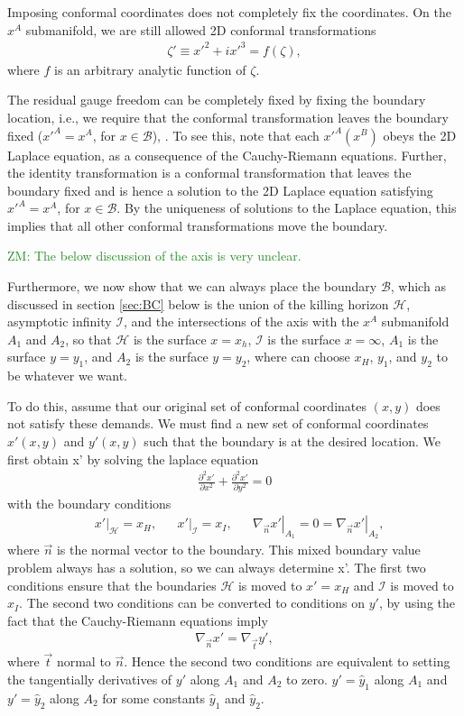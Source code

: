 \documentclass[aps,prd,amsmath,showpacs,amssymb,superscriptaddress,nofootinbib,longbibliography,eqsecnum,preprintnumbers]{revtex4-1}
\newcommand{\zach}[1]{\textcolor{ForestGreen}{#1}}
\begin{document}
Imposing conformal coordinates does not completely fix the coordinates. 
On the $x^A$ submanifold, we are still allowed 2D conformal transformations
\begin{align}
\zeta' \equiv  x'^2+ix'^3 = f(\zeta),
\end{align}
where $f$ is an arbitrary analytic function of $\zeta$.

The residual gauge freedom can be completely fixed by fixing the boundary location, i.e., we require that the conformal transformation leaves the boundary fixed ($x'^A=x^A$, for $x\in \mathcal B$), . To see this, note that each $x'^A(x^B)$ obeys the 2D Laplace equation, as a consequence of the Cauchy-Riemann equations. Further, the identity transformation is a conformal transformation that leaves the boundary fixed and is hence a solution to the 2D Laplace equation satisfying $x'^A=x^A$, for $x\in \mathcal B$. By the uniqueness of solutions to the Laplace equation, this implies that all other conformal transformations move the boundary.

\zach{ZM: The below discussion of the axis is very unclear.}

Furthermore, we now show that we can always place the boundary $\mathcal{B}$, which as discussed in section \ref{sec:BC} below is the union of the killing horizon $\mathcal H$, asymptotic infinity $\mathcal I$, and the intersections of the axis with the $x^A$ submanifold $A_1$ and $A_2$, so that $\mathcal H$ is the surface $x=x_h$, $\mathcal I$ is the surface $x=\infty$, $A_1$ is the surface $y=y_1$, and $A_2$ is the surface $y=y_2$, where can choose $x_H$, $y_1$, and $y_2$ to be whatever we want.

To do this, assume that our original set of conformal coordinates $(x,y)$ does not satisfy these demands. We must find a new set of conformal coordinates $x'(x,y)$ and $y'(x,y)$ such that the boundary is at the desired location. We first obtain x' by solving the laplace equation 
\begin{align}
\frac{\partial^2x'}{\partial x^2}+ \frac{\partial^2x'}{\partial y^2} =0
\end{align}
with the boundary conditions
\begin{align}
&\left. x' \right |_\mathcal{H}=x_H,& &\left. x' \right |_\mathcal{I}=x_I,& & \left. \nabla_{\vec n}x'\right |_{A_1}=0= \left. \nabla_{\vec n}x'\right |_{A_2},
\end{align}
where $\vec n$ is the normal vector to the boundary.
This mixed boundary value problem always has a solution, so we can always determine x'. The first two conditions ensure that the boundaries $\mathcal H$ is moved to $x'=x_H$ and $\mathcal{I}$ is moved to $x_I$. The second two conditions can be converted to conditions on $y'$, by using the fact that the Cauchy-Riemann equations imply
\begin{align}
\nabla_{\vec n}x'=\nabla_{\vec t}y',
\end{align}
where $\vec t$ normal to $\vec n$. Hence the second two conditions are equivalent to setting the tangentially derivatives of $y'$ along $A_1$ and $A_2$ to zero. $y' =\hat y_1$ along $A_1$ and $y'=\hat y_2$ along $A_2$ for some constants $\hat y_1$ and $\hat y_2$.
\end{document}

